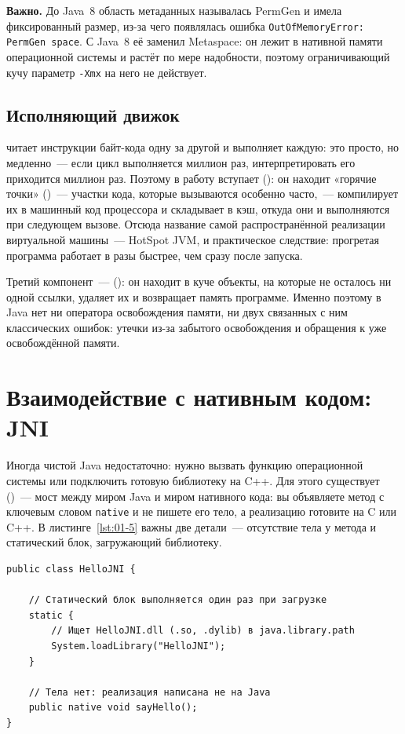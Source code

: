 \begin{vrezka}
\textbf{Важно.} До Java~8 область метаданных называлась PermGen и имела
фиксированный размер, из-за чего появлялась ошибка
\texttt{OutOfMemoryError: PermGen space}. С Java~8 её заменил Metaspace: он
лежит в нативной памяти операционной системы и растёт по мере надобности,
поэтому ограничивающий кучу параметр \texttt{-Xmx} на него не действует.
\end{vrezka}

\subsection{Исполняющий движок}

 читает инструкции байт-кода одну за другой и выполняет
каждую: это просто, но медленно~--- если цикл выполняется миллион раз,
интерпретировать его приходится миллион раз. Поэтому в работу вступает
 (): он находит «горячие точки»
()~--- участки кода, которые вызываются особенно часто,~---
компилирует их в машинный код процессора и складывает в кэш, откуда они и
выполняются при следующем вызове. Отсюда название самой распространённой
реализации виртуальной машины~--- HotSpot JVM, и практическое следствие:
прогретая программа работает в разы быстрее, чем сразу после запуска.

Третий компонент~---  (): он
находит в куче объекты, на которые не осталось ни одной ссылки, удаляет их и
возвращает память программе. Именно поэтому в Java нет ни оператора
освобождения памяти, ни двух связанных с ним классических ошибок: утечки из-за
забытого освобождения и обращения к уже освобождённой памяти.

\section{Взаимодействие с нативным кодом: JNI}

Иногда чистой Java недостаточно: нужно вызвать функцию операционной системы или
подключить готовую библиотеку на C++. Для этого существует 
()~--- мост между миром Java и миром нативного кода:
вы объявляете метод с ключевым словом \texttt{native} и не пишете его тело, а
реализацию готовите на C или C++. В листинге~\ref{lst:01-5} важны две детали~---
отсутствие тела у метода и статический блок, загружающий библиотеку.

\begin{listing}[H]
\begin{verbatim}
public class HelloJNI {

    // Статический блок выполняется один раз при загрузке
    static {
        // Ищет HelloJNI.dll (.so, .dylib) в java.library.path
        System.loadLibrary("HelloJNI");
    }

    // Тела нет: реализация написана не на Java
    public native void sayHello();
}
\end{verbatim}
\caption{Класс с нативным методом}
\label{lst:01-5}
\end{listing}

